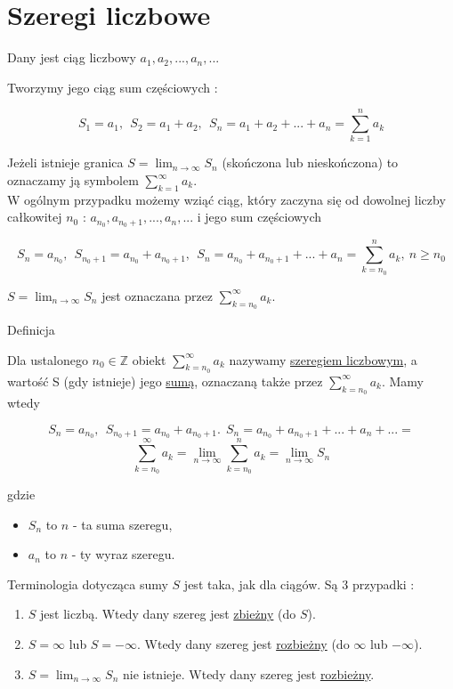 \section{Szeregi liczbowe}

Dany jest ciąg liczbowy $ a_1, a_2, ..., a_n, ... $

Tworzymy jego ciąg sum częściowych :

$$ S_1 = a_1, \ \ S_2 = a_1 + a_2, \ \ S_n = a_1 + a_2 + ... + a_n = \sum\limits_{k = 1}^{n} a_k $$

Jeżeli istnieje granica $ S = \lim_{n \to \infty} S_n $ (skończona lub nieskończona) to oznaczamy ją symbolem 
$ \sum_{k = 1}^{\infty} a_k $. \\

W ogólnym przypadku możemy wziąć ciąg, który zaczyna się od dowolnej liczby całkowitej \linebreak $ n_0 $ : $ a_{n_0}, a_{n_0 + 1}, ..., a_n, ... $
i jego sum częściowych

$$ S_n = a_{n_0}, \ \ S_{n_0 + 1} = a_{n_0} + a_{n_0 + 1}, \ \ S_n = a_{n_0} + a_{n_0 + 1} + ... + a_n = \sum\limits_{k = n_0}^{n} a_k, \ n \geq n_0 $$

$ S = \lim_{n \to \infty} S_n $ jest oznaczana przez $ \sum\limits_{k = n_0}^{\infty} a_k $. \\

\begin{tw}{Definicja} 

Dla ustalonego $ n_0 \in \mathbb{Z} $ obiekt $ \sum\limits_{k = n_0}^{\infty} a_k $ nazywamy \underline{szeregiem liczbowym},
a wartość S (gdy istnieje) jego \underline{sumą}, oznaczaną także przez $ \sum\limits_{k = n_0}^{\infty} a_k $. Mamy wtedy

\[ S_n = a_{n_0}, \ \ S_{n_0 + 1} = a_{n_0} + a_{n_0 + 1}. \ \ S_n = a_{n_0} + a_{n_0 + 1} + ... + a_n + ... = \]
\[ \sum\limits_{k = n_0}^{\infty} a_k = \lim_{n \to \infty} \sum\limits_{k = n_0}^{n} a_k = \lim_{n \to \infty} S_n \]

gdzie

\begin{itemize}
    \item $ S_n $ to $n$ - ta suma szeregu,
    \item $ a_n $ to $n$ - ty wyraz szeregu. \\
\end{itemize}

Terminologia dotycząca sumy $S$ jest taka, jak dla ciągów. Są 3 przypadki : 

\begin{enumerate}
    \item $S$ jest liczbą. Wtedy dany szereg jest \underline{zbieżny} (do $S$).
    \item $S = \infty$ lub $S = -\infty$. Wtedy dany szereg jest \underline{rozbieżny} (do $\infty$ lub $-\infty$).
    \item $ S = \lim_{n \to \infty} S_n $ nie istnieje. Wtedy dany szereg jest \underline{rozbieżny}. \\
\end{enumerate}

\end{tw}

